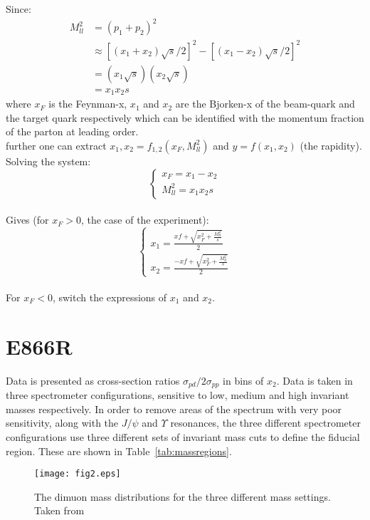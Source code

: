 \documentclass[11pt]{article}
\newcommand{\be}{\begin{equation}}
\newcommand{\ee}{\end{equation}}
\begin{document}
Since:
\begin{align*}
    M_{ll}^2 &= (p_1 + p_2)^2 \\ 
    & \approx [(x_1+x_2)\sqrt{s}/2]^2 - [(x_1-x_2)\sqrt{s}/2]^2\\
    & = (x_1\sqrt{s})(x_2\sqrt{s})\\
    & = x_1x_2s
\end{align*}
where $x_F$ is the Feynman-x, $x_1$ and $x_2$ are the Bjorken-x of the beam-quark and the target quark respectively which can be identified with the momentum fraction of the parton at leading order.
\\further one can extract $x_1,x_2=f_{1,2}(x_F,M^2_{ll})$ and $y=f(x_1,x_2)$ (the rapidity).
\\Solving the system:\\
\be \begin{cases}
x_F = x_1 - x_2 \\
M^2_{ll} = x_1x_2s
\end{cases} \ee
\\Gives (for $x_F > 0$, the case of the experiment):\\
\be
\begin{cases}
x_1 = \frac{xf+\sqrt{x_F^2 + \frac{M^2_{ll}}{s}}}{2} \\
x_2 = \frac{-xf+\sqrt{x_F^2 + \frac{M^2_{ll}}{s}}}{2}
\end{cases}
\ee
\\For $x_F < 0$, switch the expressions of $x_1$ and $x_2$.
\section{E866R}
Data is presented as cross-section ratios $\sigma_{pd}/2\sigma_{pp}$ in bins of $x_2$.
Data is taken in three spectrometer configurations, sensitive to low, medium and high invariant
masses respectively. In order to remove areas of the spectrum with very poor sensitivity, along with the $J/\psi$ and $\Upsilon$ resonances,
the three different spectrometer configurations use three different sets of invariant mass cuts to define the fiducial region. These are shown
in Table~\ref{tab:massregions}.

\begin{figure}[!h]
  \begin{center}
  \texttt{[image: fig2.eps]}
    \vspace*{-0.05in}                                
  \end{center}       
  \caption{The dimuon mass distributions for the three different mass settings. Taken from \cite{Towell:2001nh}}
  \label{fig:3mass}                    
\end{figure}      
\end{document}
